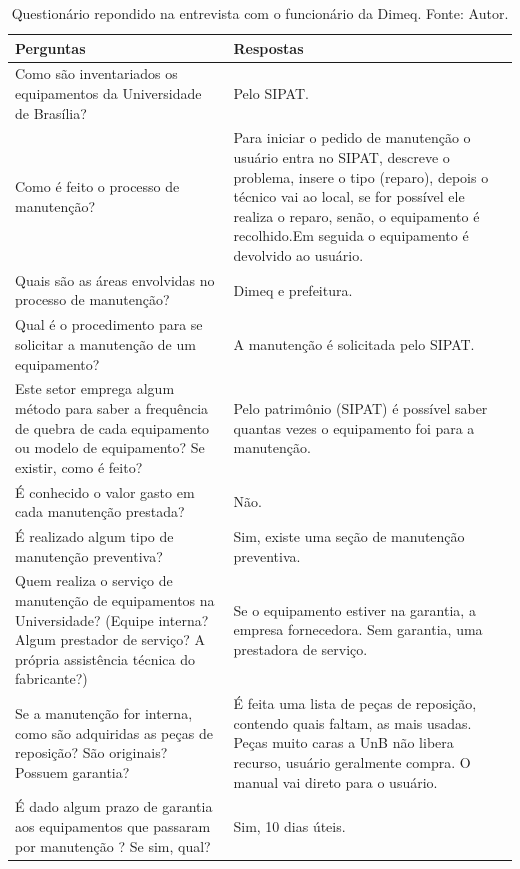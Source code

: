 \begin{table}[H]
\centering
\caption{Questionário repondido na entrevista com o funcionário da Dimeq. Fonte: Autor.}
\label{questionario}
\begin{tabular}{ |p{7cm}| p{8cm} |}
\hline
	Perguntas & Respostas \\ \hline
	Como são inventariados os equipamentos da Universidade de Brasília? & Pelo SIPAT. \\ \hline
	Como é feito o processo de manutenção? & Para iniciar o pedido de manutenção o usuário entra no SIPAT, descreve o problema, insere o tipo (reparo), depois o técnico vai ao local, se for possível ele realiza o reparo, senão, o equipamento é recolhido.Em seguida o equipamento é devolvido ao usuário. \\ \hline
	Quais são as áreas envolvidas no processo de manutenção? & Dimeq e prefeitura. \\ \hline
	Qual é o procedimento para se solicitar a manutenção de um equipamento? & A manutenção é solicitada pelo SIPAT. \\ \hline
	Este setor emprega algum método para saber a frequência de quebra de cada equipamento ou modelo de equipamento? Se existir, como é feito? & Pelo patrimônio (SIPAT) é possível saber quantas vezes o equipamento foi para a manutenção. \\ \hline
	É conhecido o valor gasto em cada manutenção prestada? & Não. \\ \hline
	É realizado algum tipo de manutenção preventiva? & Sim, existe uma seção de manutenção preventiva. \\ \hline
	Quem realiza o serviço de manutenção de equipamentos na Universidade? (Equipe interna? Algum prestador de serviço? A própria assistência técnica do fabricante?) & Se o equipamento estiver na garantia, a empresa fornecedora. Sem garantia, uma prestadora de serviço. \\ \hline
	Se a manutenção for interna, como são adquiridas as peças de reposição? São originais? Possuem garantia? & É feita uma lista de peças de reposição, contendo quais faltam, as mais usadas. Peças muito caras a UnB não libera recurso, usuário geralmente compra. O manual vai direto para o usuário. \\ \hline
	É dado algum prazo de garantia aos equipamentos que passaram por manutenção ? Se sim, qual? & Sim, 10 dias úteis.\\ \hline
\end{tabular}
\end{table}


